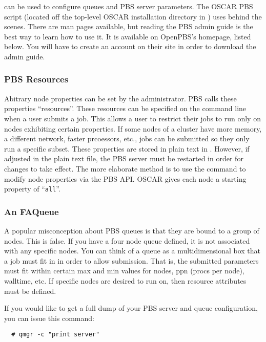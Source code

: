  can be used to configure queues and PBS server parameters.
The OSCAR PBS  script (located off the top-level
OSCAR installation directory in ) uses
 behind the scenes.  There are man pages available, but
reading the PBS admin guide is the best way to learn how to use it.
It is available on OpenPBS's homepage, listed below.  You will have to
create an account on their site in order to download the admin guide.

\subsubsection{PBS Resources}

Abitrary node properties can be set by the administrator.  PBS calls
these properties ``resources''.  These resources can be specified on
the  command line when a user submits a job.  This allows a
user to restrict their jobs to run only on nodes exhibiting certain
properties.  If some nodes of a cluster have more memory, a different
network, faster prcoessors, etc., jobs can be submitted so they only
run a specific subset.  These properties are stored in plain text in
.  However, if adjusted in the
plain text file, the PBS server must be restarted in order for changes
to take effect.  The more elaborate method is to use the 
command to modify node properties via the PBS API.  OSCAR gives each
node a starting property of ``{\tt all}''.

\subsubsection{An FAQueue}

A popular misconception about PBS queues is that they are bound to a
group of nodes.  This is false.  If you have a four node queue
defined, it is not associated with any specific nodes.  You can think
of a queue as a multidimensional box that a job must fit in in order
to allow submission.  That is, the submitted parameters must fit
within certain max and min values for nodes, ppn (procs per node),
walltime, etc.  If specific nodes are desired to run on, then resource
attributes must be defined.

If you would like to get a full dump of your PBS server and queue
configuration, you can issue this command:

\begin{verbatim}
  # qmgr -c "print server"
\end{verbatim}

